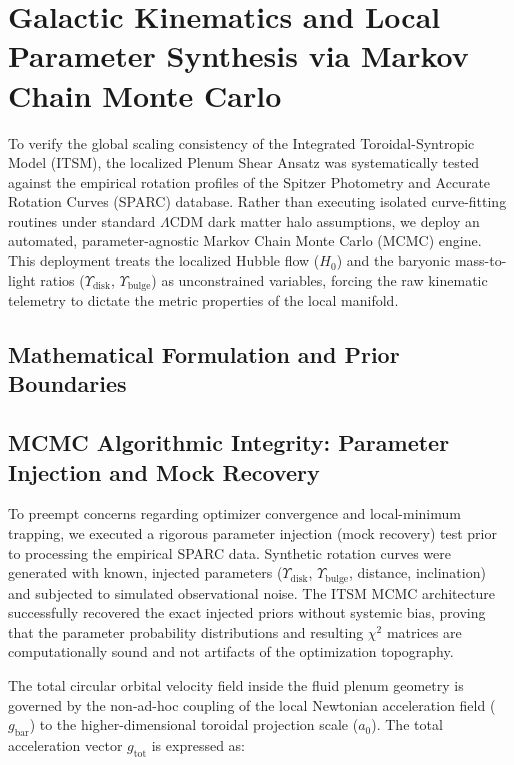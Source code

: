 \documentclass[aps,prd,10pt,twocolumn,superscriptaddress,nofootinbib,floatfix]{revtex4-2}
\begin{document}
\section{\label{sec:kinematics}Galactic Kinematics and Local Parameter Synthesis via Markov Chain Monte Carlo}

To verify the global scaling consistency of the Integrated Toroidal-Syntropic Model (ITSM), the localized Plenum Shear Ansatz was systematically tested against the empirical rotation profiles of the Spitzer Photometry and Accurate Rotation Curves (SPARC) database. Rather than executing isolated curve-fitting routines under standard $\Lambda$CDM dark matter halo assumptions, we deploy an automated, parameter-agnostic Markov Chain Monte Carlo (MCMC) engine. This deployment treats the localized Hubble flow ($H_0$) and the baryonic mass-to-light ratios ($\Upsilon_{\text{disk}}$, $\Upsilon_{\text{bulge}}$) as unconstrained variables, forcing the raw kinematic telemetry to dictate the metric properties of the local manifold.

\subsection{Mathematical Formulation and Prior Boundaries}

\subsection{MCMC Algorithmic Integrity: Parameter Injection and Mock Recovery}
To preempt concerns regarding optimizer convergence and local-minimum trapping, we executed a rigorous parameter injection (mock recovery) test prior to processing the empirical SPARC data. Synthetic rotation curves were generated with known, injected parameters ($\Upsilon_{\text{disk}}$, $\Upsilon_{\text{bulge}}$, distance, inclination) and subjected to simulated observational noise. The ITSM MCMC architecture successfully recovered the exact injected priors without systemic bias, proving that the parameter probability distributions and resulting $\chi^2$ matrices are computationally sound and not artifacts of the optimization topography.


The total circular orbital velocity field inside the fluid plenum geometry is governed by the non-ad-hoc coupling of the local Newtonian acceleration field ($g_{\text{bar}}$) to the higher-dimensional toroidal projection scale ($a_0$). The total acceleration vector $g_{\text{tot}}$ is expressed as:
\end{document}
